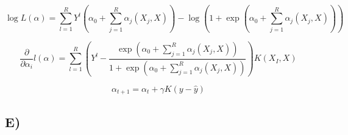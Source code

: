 \documentclass{report}
\begin{document}
\begin{equation}
  \log L(\alpha) =
  \sum_{l=1}^{R} Y^l
  (\alpha_0 + \sum_{j=1}^{R}\alpha_j(X_j,X))
  -
  \log(1+\exp(\alpha_0 + \sum_{j=1}^{R}\alpha_j(X_j,X)))
\end{equation}

\begin{equation}
  \frac{\partial}{\partial \alpha_i} l(\alpha) =
  \sum_{l=1}^{R}\left(Y^l -
  \frac{
  \exp(\alpha_0 + \sum_{j=1}^{R}\alpha_j(X_j,X))
  }{
  1+\exp(\alpha_0 + \sum_{j=1}^{R}\alpha_j(X_j,X))
  }
  \right)
  K(X_I,X)
\end{equation}

\begin{equation}
    \alpha_{t+1} = \alpha_t + \gamma K(y - \hat{y})
\end{equation}

\subsection*{E)}
\end{document}

